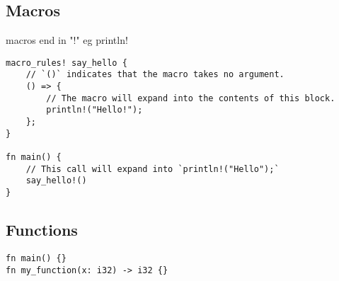 
\subsection{Macros}

macros end in "!"
eg println!

\begin{verbatim}
macro_rules! say_hello {
    // `()` indicates that the macro takes no argument.
    () => {
        // The macro will expand into the contents of this block.
        println!("Hello!");
    };
}

fn main() {
    // This call will expand into `println!("Hello");`
    say_hello!()
}
\end{verbatim}


\subsection{Functions}

\begin{verbatim}
fn main() {}
fn my_function(x: i32) -> i32 {}

\end{verbatim}

